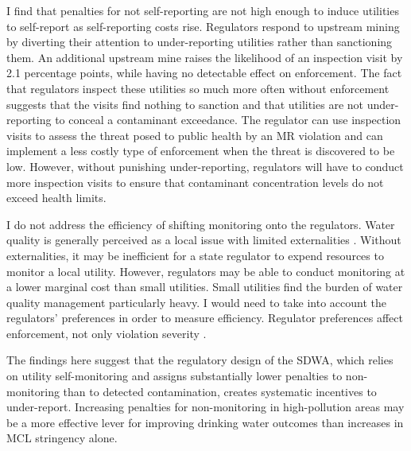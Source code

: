 \documentclass[12pt]{article}
\begin{document}
I find that penalties for not self-reporting are not high enough to induce utilities to self-report as self-reporting costs rise. Regulators respond to upstream mining by diverting their attention to under-reporting utilities rather than sanctioning them. An additional upstream mine raises the likelihood of an inspection visit by 2.1 percentage points, while having no detectable effect on enforcement. The fact that regulators inspect these utilities so much more often without enforcement suggests that the visits find nothing to sanction and that utilities are not under-reporting to conceal a contaminant exceedance. The regulator can use inspection visits to assess the threat posed to public health by an MR violation and can implement a less costly type of enforcement when the threat is discovered to be low. However, without punishing under-reporting, regulators will have to conduct more inspection visits to ensure that contaminant concentration levels do not exceed health limits.

I do not address the efficiency of shifting monitoring onto the regulators. Water quality is generally perceived as a local issue with limited externalities \parencite{olmstead2010economics}. Without externalities, it may be inefficient for a state regulator to expend resources to monitor a local utility. However, regulators may be able to conduct monitoring at a lower marginal cost than small utilities. Small utilities find the burden of water quality management particularly heavy. I would need to take into account the regulators' preferences in order to measure efficiency. Regulator preferences affect enforcement, not only violation severity \parencite{kang2021understanding}.

The findings here suggest that the regulatory design of the SDWA, which relies on utility self-monitoring and assigns substantially lower penalties to non-monitoring than to detected contamination, creates systematic incentives to under-report. Increasing penalties for non-monitoring in high-pollution areas may be a more effective lever for improving drinking water outcomes than increases in MCL stringency alone.


\newpage


\end{document}
